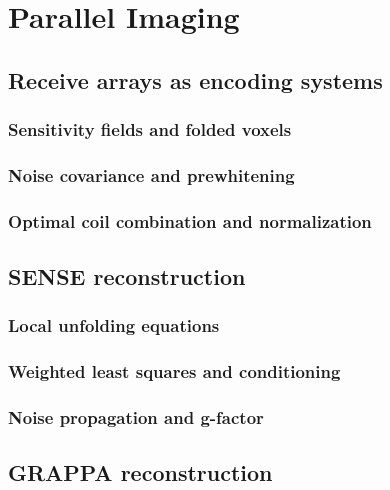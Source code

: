 \chapter{Parallel Imaging}
\label{ch:14}

\section{Receive arrays as encoding systems}
\label{sec:14:receive-arrays-as-encoding-systems}
\subsection{Sensitivity fields and folded voxels}
\subsection{Noise covariance and prewhitening}
\subsection{Optimal coil combination and normalization}

\section{SENSE reconstruction}
\label{sec:14:sense-reconstruction}
\subsection{Local unfolding equations}
\subsection{Weighted least squares and conditioning}
\subsection{Noise propagation and g-factor}

\section{GRAPPA reconstruction}
\label{sec:14:grappa-reconstruction}
